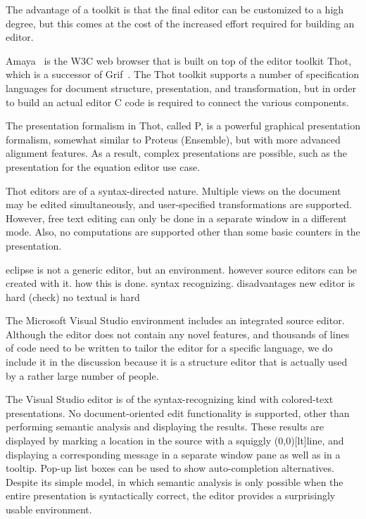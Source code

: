 \documentclass{speauth}
\begin{document}
The advantage of a toolkit is that the final editor can be customized to a high degree, but this comes at the cost of the increased effort required for building an editor. 


Amaya~\cite{amaya04} is the W3C web browser that is built on top of the editor toolkit Thot\cite{quint97thot}, which is a successor of Grif~\cite{quint86grif}. The Thot toolkit supports a number of specification languages for document structure, presentation, and transformation, but in order to build an actual editor C code is required to connect the various components.

The presentation formalism in Thot, called P, is a powerful graphical presentation formalism, somewhat similar to Proteus (Ensemble), but with more advanced alignment features. As a result, complex presentations are possible, such as the presentation for the equation editor use case.

Thot editors are of a syntax-directed nature. Multiple views on the document may be edited simultaneously, and user-specified transformations are supported. However, free text editing can only be done in a separate window in a different mode. Also, no computations are supported other than some basic counters in the presentation. 


eclipse is not a generic editor, but an environment. however source editors can be created with it.
how this is done. syntax recognizing.
disadvantages
new editor is hard (check)
no textual is hard

%


The Microsoft Visual Studio environment includes an integrated source editor. Although the editor does not contain any novel features, and thousands of lines of code need to be written to tailor the editor for a specific language, we do include it in the discussion because it is a structure editor that is actually used by a rather large number of people. 

The Visual Studio editor is of the syntax-recognizing kind with colored-text presentations. No document-oriented edit functionality is supported, other than performing semantic analysis and displaying the results. These results are displayed by marking a location in the source with a squiggly \makebox(0,0)[lt]{}line, and displaying a corresponding message in a separate window pane as well as in a tooltip. Pop-up list boxes can be used to show auto-completion alternatives. Despite its simple model, in which semantic analysis is only possible when the entire presentation is syntactically correct, the editor provides a surprisingly usable environment. 
\end{document}
